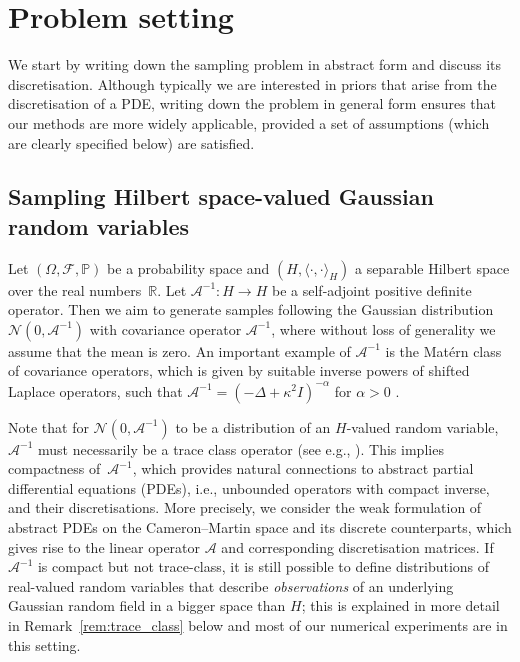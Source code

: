 \documentclass[11pt,english]{article}
\theoremstyle{plain}
\theoremstyle{plain}
\theoremstyle{plain}
\theoremstyle{plain}
\numberwithin{equation}{section}
\newcommand*{\id}{I}
\newcommand{\rev}[1]{#1}
\begin{document}
\section{Problem setting}\label{sec:problem_setting}


We start by writing down the sampling problem in abstract form and discuss its discretisation. Although typically we are interested in priors that arise from the discretisation of a PDE, writing down the problem in general form ensures that our methods are more widely applicable, provided a set of assumptions (which are clearly specified below) are satisfied.
\subsection{Sampling Hilbert space-valued Gaussian random variables}\label{sec:sampling_hilbert_space}

Let $(\Omega,\mathcal{\mathscr{F}},\mathbb{P})$ be a probability space
and $(H,\langle\cdot,\cdot\rangle_{H})$ a separable Hilbert
space \rev{over the real numbers~$\mathbb{R}$}. Let $\mathcal{A}^{-1}\colon H\to H$ be a self-adjoint positive
definite operator.
Then we aim to generate samples following the Gaussian distribution
$\mathcal{N}(0,\mathcal{A}^{-1})$ with covariance operator $\mathcal{A}^{-1}$, where without loss of generality we assume that the mean is zero. An important example of $\mathcal{A}^{-1}$ is the Mat\'ern class of covariance operators, which is given by suitable inverse powers of shifted Laplace operators, such that  $\mathcal{A}^{-1}=(-\Delta+\kappa^2\id)^{-\alpha}$ for $\alpha>0$ \cite{whittle1954stationary,whittle1963stochastic,LindgrenEtAl.F_2011_ExplicitLinkGaussian,BolinEtAl.D_2020_NumericalSolutionFractional}.


Note that for $\mathcal{N}(0,\mathcal{A}^{-1})$ to be a distribution
of an $H$-valued random variable, $\mathcal{A}^{-1}$ must necessarily
be a trace class operator (see e.g., \cite[Proposition
2.16]{DaPrato.D_2014_book}). This implies compactness
of~$\mathcal{A}^{-1}$, which provides natural connections to abstract
partial differential equations (PDEs), i.e., unbounded operators
with compact inverse, and their discretisations. More precisely, we
consider the weak formulation of abstract PDEs on the Cameron--Martin
space and  its discrete counterparts, which gives rise to the linear
operator $\mathcal{A}$ and corresponding discretisation matrices. If
$\mathcal{A}^{-1}$ is compact but not trace-class, it is still
possible to define distributions of real-valued random variables that
describe \textit{observations} of an underlying Gaussian random field
in a bigger space than $H$; this is explained in more detail in
Remark~\ref{rem:trace_class} below \rev{and most of our numerical
experiments are in this setting}.
\end{document}

